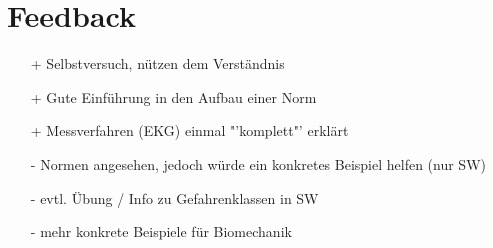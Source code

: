\section{Feedback}
\begin{itemize}
    \item[+] Selbstversuch, nützen dem Verständnis
    \item[+] Gute Einführung in den Aufbau einer Norm
    \item[+] Messverfahren (EKG) einmal "'komplett"' erklärt
    \item[-] Normen angesehen, jedoch würde ein konkretes Beispiel helfen (nur SW)
    \item[-] evtl. Übung / Info zu Gefahrenklassen in SW
    \item[-] mehr konkrete Beispiele für Biomechanik
\end{itemize}
